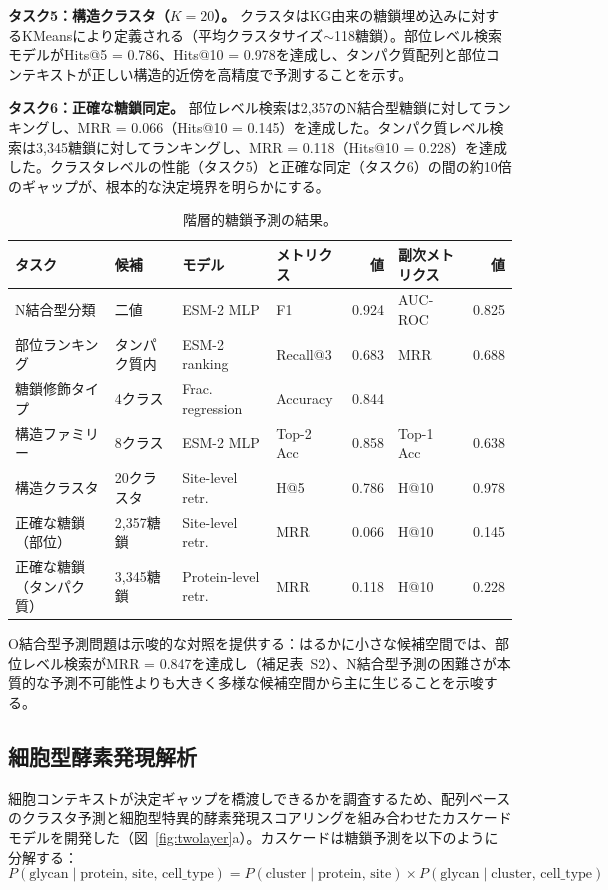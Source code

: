 \documentclass[11pt,a4paper]{ltjsarticle}
\begin{document}
\textbf{タスク5：構造クラスタ（$K = 20$）。}
クラスタはKG由来の糖鎖埋め込みに対するKMeansにより定義される（平均クラスタサイズ$\sim$118糖鎖）。部位レベル検索モデルがHits@5 = 0.786、Hits@10 = 0.978を達成し、タンパク質配列と部位コンテキストが正しい構造的近傍を高精度で予測することを示す。

\textbf{タスク6：正確な糖鎖同定。}
部位レベル検索は2,357のN結合型糖鎖に対してランキングし、MRR = 0.066（Hits@10 = 0.145）を達成した。タンパク質レベル検索は3,345糖鎖に対してランキングし、MRR = 0.118（Hits@10 = 0.228）を達成した。クラスタレベルの性能（タスク5）と正確な同定（タスク6）の間の約10倍のギャップが、根本的な決定境界を明らかにする。

\begin{table}[ht]
\centering
\caption{階層的糖鎖予測の結果。}
\label{tab:hierarchical}
\small
\begin{tabular}{llllrlr}
\toprule
\textbf{タスク} & \textbf{候補} & \textbf{モデル} & \textbf{メトリクス} & \textbf{値} & \textbf{副次メトリクス} & \textbf{値} \\
\midrule
N結合型分類 & 二値 & ESM-2 MLP & F1 & 0.924 & AUC-ROC & 0.825 \\
部位ランキング & タンパク質内 & ESM-2 ranking & Recall@3 & 0.683 & MRR & 0.688 \\
糖鎖修飾タイプ & 4クラス & Frac. regression & Accuracy & 0.844 & & \\
構造ファミリー & 8クラス & ESM-2 MLP & Top-2 Acc & 0.858 & Top-1 Acc & 0.638 \\
構造クラスタ & 20クラスタ & Site-level retr. & H@5 & 0.786 & H@10 & 0.978 \\
正確な糖鎖（部位） & 2,357糖鎖 & Site-level retr. & MRR & 0.066 & H@10 & 0.145 \\
正確な糖鎖（タンパク質） & 3,345糖鎖 & Protein-level retr. & MRR & 0.118 & H@10 & 0.228 \\
\bottomrule
\end{tabular}
\end{table}

O結合型予測問題は示唆的な対照を提供する：はるかに小さな候補空間では、部位レベル検索がMRR = 0.847を達成し（補足表~S2）、N結合型予測の困難さが本質的な予測不可能性よりも大きく多様な候補空間から主に生じることを示唆する。

\subsection{細胞型酵素発現解析}

細胞コンテキストが決定ギャップを橋渡しできるかを調査するため、配列ベースのクラスタ予測と細胞型特異的酵素発現スコアリングを組み合わせたカスケードモデルを開発した（図~\ref{fig:twolayer}a）。カスケードは糖鎖予測を以下のように分解する：
\begin{equation}
P(\text{glycan} \mid \text{protein, site, cell\_type}) = P(\text{cluster} \mid \text{protein, site}) \times P(\text{glycan} \mid \text{cluster, cell\_type})
\end{equation}
\end{document}
